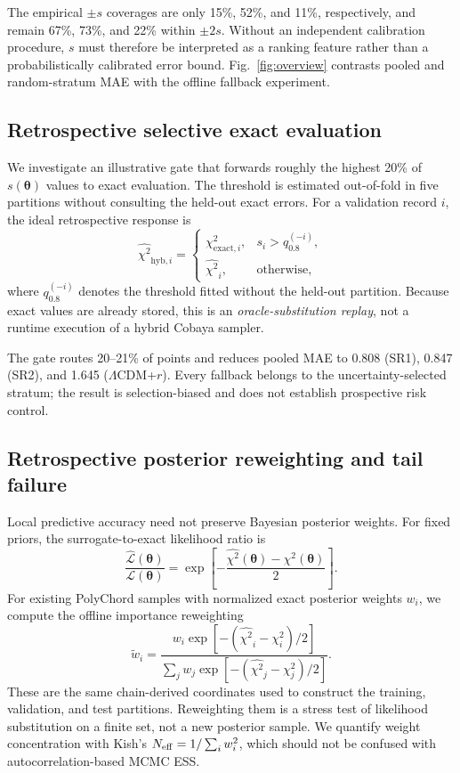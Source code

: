 \documentclass[a4paper,conference,10pt]{IEEEtran}
\begin{document}
The empirical $\pm s$ coverages are only 15\%, 52\%, and 11\%, respectively, and remain 67\%, 73\%, and 22\% within $\pm2s$. Without an independent calibration procedure, $s$ must therefore be interpreted as a ranking feature rather than a probabilistically calibrated error bound. Fig.~\ref{fig:overview} contrasts pooled and random-stratum MAE with the offline fallback experiment.

\subsection{Retrospective selective exact evaluation}
We investigate an illustrative gate that forwards roughly the highest 20\% of $s(\boldsymbol\theta)$ values to exact evaluation. The threshold is estimated out-of-fold in five partitions without consulting the held-out exact errors. For a validation record $i$, the ideal retrospective response is
\begin{equation}
\widehat{\chi^2}_{\mathrm{hyb},i}=\begin{cases}
\chi^2_{\mathrm{exact},i},&s_i>q_{0.8}^{(-i)},\\
\widehat{\chi^2}_i,&\text{otherwise},
\end{cases}
\label{eq:gate}
\end{equation}
where $q_{0.8}^{(-i)}$ denotes the threshold fitted without the held-out partition. Because exact values are already stored, this is an \emph{oracle-substitution replay}, not a runtime execution of a hybrid Cobaya sampler.

The gate routes 20--21\% of points and reduces pooled MAE to 0.808 (SR1), 0.847 (SR2), and 1.645 ($\Lambda$CDM+$r$). Every fallback belongs to the uncertainty-selected stratum; the result is selection-biased and does not establish prospective risk control.

\subsection{Retrospective posterior reweighting and tail failure}
Local predictive accuracy need not preserve Bayesian posterior
weights. For fixed priors, the surrogate-to-exact likelihood ratio is
\begin{equation}
 \frac{\widehat{\mathcal L}(\boldsymbol\theta)}{\mathcal L(\boldsymbol\theta)}
 =\exp\!\left[-\frac{\widehat{\chi^2}(\boldsymbol\theta)-
 \chi^2(\boldsymbol\theta)}{2}\right]. \label{eq:lratio}
\end{equation}
For existing PolyChord samples with normalized exact posterior
weights $w_i$, we compute the offline importance reweighting
\begin{equation}
 \widetilde w_i=\frac{w_i\exp[-(\widehat{\chi^2}_i-\chi^2_i)/2]}
 {\sum_j w_j\exp[-(\widehat{\chi^2}_j-\chi^2_j)/2]}.
 \label{eq:reweight}
\end{equation}
These are the same chain-derived coordinates used to construct the training, validation, and test partitions. Reweighting them is a stress test of likelihood substitution on a finite set, not a new posterior sample. We quantify weight concentration with Kish's $N_{\rm eff}=1/\sum_i w_i^2$, which should not be confused with autocorrelation-based MCMC ESS.
\end{document}
